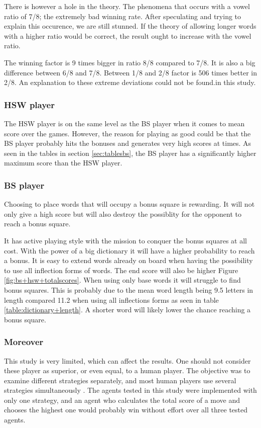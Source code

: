 \documentclass[a4paper, 12pt]{report}
\begin{document}
There is however a hole in the theory. The phenomena that occurs with a vowel ratio of 7/8; the extremely bad winning rate. After speculating and trying to explain this occurence, we are still stunned. If the theory of allowing longer words with a higher ratio would be correct, the result ought to increase with the vowel ratio.

The winning factor is 9 times bigger in ratio 8/8 compared to 7/8. It is also a big difference between 6/8 and 7/8. Between 1/8 and 2/8 factor is 506 times better in 2/8. An explanation to these extreme deviations could not be found.in this study.

\subsubsection{HSW player}
The HSW player is on the same level as the BS player when it comes to mean score over the games. However, the reason for playing as good could be that the BS player probably hits the bonuses and generates very high scores at times. As seen in the tables in section \ref{sec:tablesbs}, the BS player has a significantly higher maximum score than the HSW player.

\subsubsection{BS player}
Choosing to place words that will occupy a bonus square is rewarding. It will not only give a high score but will also destroy the possiblity for the opponent to reach a bonus square.

It has active playing style with the mission to conquer the bonus squares at all cost. With the power of a big dictionary it will have a higher probability to reach a bonus. It is easy to extend words already on board when having the possibility to use all inflection forms of words. The end score will also be higher Figure \ref{fig:bs+hsw+totalscores}. When using only base words it will struggle to find bonus squares. This is probably due to the mean word length being 9.5 letters in length compared 11.2 when using all inflections forms as seen in table \ref{table:dictionary+length}. A shorter word will likely lower the chance reaching a bonus square.

\subsubsection{Moreover}
This study is very limited, which can affect the results. One should not consider these player as superior, or even equal, to a human player. The objective was to examine different strategies separately, and most human players use several strategies simultaneously \cite{perfectgame}. The agents tested in this study were implemented with only one strategy, and an agent who calculates the total score of a move and chooses the highest one would probably win without effort over all three tested agents. 
\end{document}
